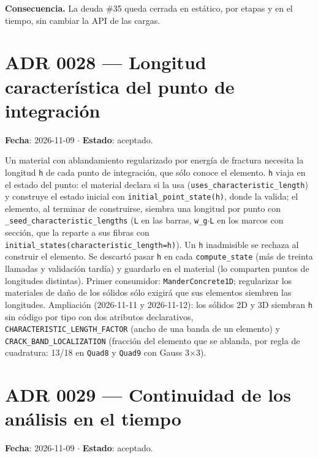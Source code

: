 \documentclass[11pt,oneside]{report}
\begin{document}
\textbf{Consecuencia.} La deuda \#35 queda cerrada en estático, por etapas y en el tiempo, sin cambiar la API de las cargas.

\section{ADR 0028 --- Longitud característica del punto de integración}
\label{adr:0028}

\textbf{Fecha}: 2026-11-09 \ensuremath{\cdot} \textbf{Estado}: aceptado.

Un material con ablandamiento regularizado por energía de fractura necesita la longitud \texttt{h} de cada punto de integración, que sólo conoce el elemento. \texttt{h} viaja en el estado del punto: el material declara si la usa (\texttt{uses\_\allowbreak{}characteristic\_\allowbreak{}length}) y construye el estado inicial con \texttt{initial\_\allowbreak{}point\_\allowbreak{}state(h)}, donde la valida; el elemento, al terminar de construirse, siembra una longitud por punto con \texttt{\_\allowbreak{}seed\_\allowbreak{}characteristic\_\allowbreak{}lengths} (\texttt{L} en las barras, \texttt{w\_g\ensuremath{\cdot}L} en los marcos con sección, que la reparte a sus fibras con \texttt{initial\_\allowbreak{}states(characteristic\_\allowbreak{}length=h)}). Un \texttt{h} inadmisible se rechaza al construir el elemento. Se descartó pasar \texttt{h} en cada \texttt{compute\_state} (más de treinta llamadas y validación tardía) y guardarlo en el material (lo comparten puntos de longitudes distintas). Primer consumidor: \texttt{ManderConcrete1D}; regularizar los materiales de daño de los sólidos sólo exigirá que sus elementos siembren las longitudes. Ampliación (2026-11-11 y 2026-11-12): los sólidos 2D y 3D siembran \texttt{h} sin código por tipo con dos atributos declarativos, \texttt{CHARACTERISTIC\_\allowbreak{}LENGTH\_\allowbreak{}FACTOR} (ancho de una banda de un elemento) y \texttt{CRACK\_\allowbreak{}BAND\_\allowbreak{}LOCALIZATION} (fracción del elemento que se ablanda, por regla de cuadratura: 13/18 en \texttt{Quad8} y \texttt{Quad9} con Gauss 3\ensuremath{\times}3).

\section{ADR 0029 --- Continuidad de los análisis en el tiempo}
\label{adr:0029}

\textbf{Fecha}: 2026-11-09 \ensuremath{\cdot} \textbf{Estado}: aceptado.
\end{document}
